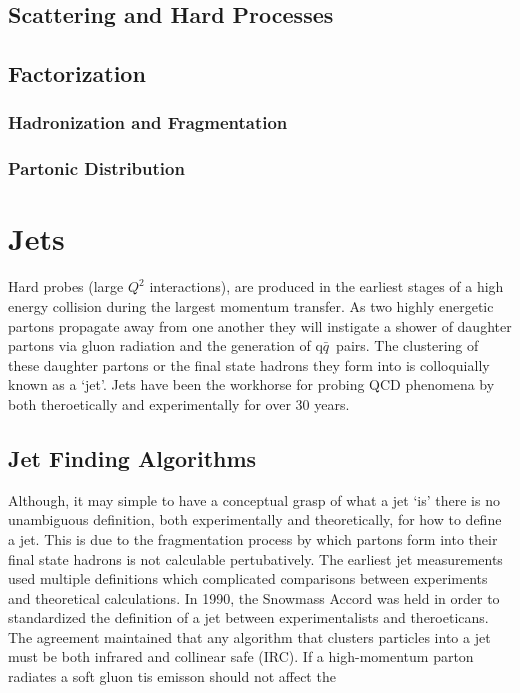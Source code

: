 \subsection{Scattering and Hard Processes}




\subsection{Factorization}

\subsubsection{Hadronization and Fragmentation}

\subsubsection{Partonic Distribution}



\section{Jets}

Hard probes (large $Q^{2}$ interactions), are produced in the earliest stages of a high energy collision during the largest momentum transfer.  As two highly energetic partons propagate away from one another they will instigate a shower of daughter partons via gluon radiation and the generation of q$\bar{q}$\, pairs.  The clustering of these daughter partons or the final state hadrons they form into is colloquially known as a `jet'.   Jets have been the workhorse for probing QCD phenomena by both theroetically and experimentally for over 30 years.  

\subsection{Jet Finding Algorithms}
Although, it may simple to have a conceptual grasp of what a jet `is' there is no unambiguous definition, both experimentally and theoretically, for how to define a jet.  This is due to the fragmentation process by which partons form into their final state hadrons is not calculable pertubatively.  The earliest jet measurements used multiple definitions which complicated comparisons between experiments and theoretical calculations.  In 1990, the Snowmass Accord\cite{Huth:217490} was held in order to standardized the definition of a jet between experimentalists and theroeticans.  The agreement maintained that any algorithm that clusters particles into a jet must be both infrared and collinear safe (IRC).  If a high-momentum parton radiates a soft gluon tis emisson should not affect the 

